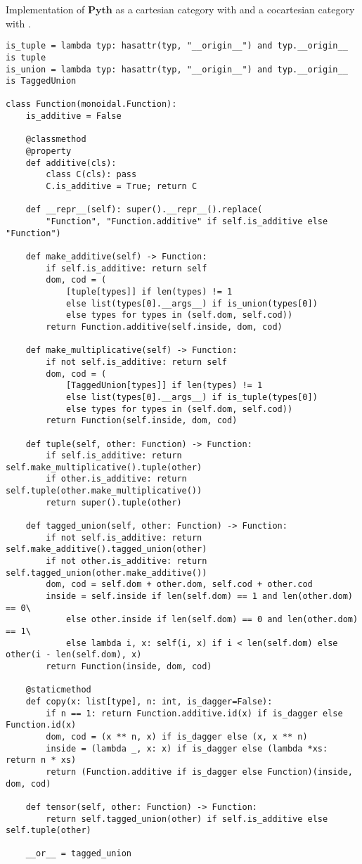 \begin{python}
{\normalfont Implementation of $\mathbf{Pyth}$ as a cartesian category with  and a cocartesian category with .}

\begin{verbatim}
is_tuple = lambda typ: hasattr(typ, "__origin__") and typ.__origin__ is tuple
is_union = lambda typ: hasattr(typ, "__origin__") and typ.__origin__ is TaggedUnion

class Function(monoidal.Function):
    is_additive = False

    @classmethod
    @property
    def additive(cls):
        class C(cls): pass
        C.is_additive = True; return C

    def __repr__(self): super().__repr__().replace(
        "Function", "Function.additive" if self.is_additive else "Function")

    def make_additive(self) -> Function:
        if self.is_additive: return self
        dom, cod = (
            [tuple[types]] if len(types) != 1
            else list(types[0].__args__) if is_union(types[0])
            else types for types in (self.dom, self.cod))
        return Function.additive(self.inside, dom, cod)

    def make_multiplicative(self) -> Function:
        if not self.is_additive: return self
        dom, cod = (
            [TaggedUnion[types]] if len(types) != 1
            else list(types[0].__args__) if is_tuple(types[0])
            else types for types in (self.dom, self.cod))
        return Function(self.inside, dom, cod)

    def tuple(self, other: Function) -> Function:
        if self.is_additive: return self.make_multiplicative().tuple(other)
        if other.is_additive: return self.tuple(other.make_multiplicative())
        return super().tuple(other)

    def tagged_union(self, other: Function) -> Function:
        if not self.is_additive: return self.make_additive().tagged_union(other)
        if not other.is_additive: return self.tagged_union(other.make_additive())
        dom, cod = self.dom + other.dom, self.cod + other.cod
        inside = self.inside if len(self.dom) == 1 and len(other.dom) == 0\
            else other.inside if len(self.dom) == 0 and len(other.dom) == 1\
            else lambda i, x: self(i, x) if i < len(self.dom) else other(i - len(self.dom), x)
        return Function(inside, dom, cod)

    @staticmethod
    def copy(x: list[type], n: int, is_dagger=False):
        if n == 1: return Function.additive.id(x) if is_dagger else Function.id(x)
        dom, cod = (x ** n, x) if is_dagger else (x, x ** n)
        inside = (lambda _, x: x) if is_dagger else (lambda *xs: return n * xs)
        return (Function.additive if is_dagger else Function)(inside, dom, cod)

    def tensor(self, other: Function) -> Function:
        return self.tagged_union(other) if self.is_additive else self.tuple(other)

    __or__ = tagged_union
\end{verbatim}
\end{python}

